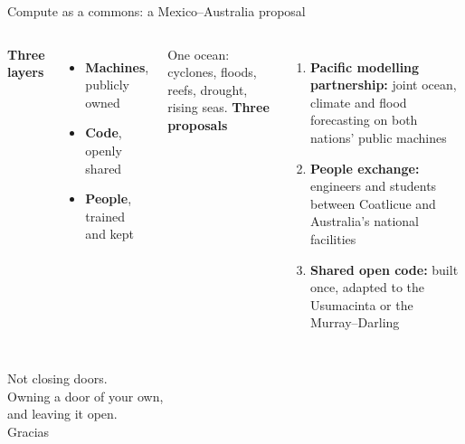 \documentclass[aspectratio=169,11pt]{beamer}
\begin{document}
\begin{frame}{Compute as a commons: a Mexico--Australia proposal}
\begin{columns}[T]
{\bfseries\color{ocean}Three layers}
\begin{itemize}\small
\item \textbf{Machines}, publicly owned
\item \textbf{Code}, openly shared
\item \textbf{People}, trained and kept
\end{itemize}
\vspace{0.3em}
{\small\color{mute}One ocean: cyclones, floods, reefs, drought, rising seas.}
{\bfseries\color{ocean}Three proposals}
\begin{enumerate}\small
\item \textbf{Pacific modelling partnership:} joint ocean, climate and flood forecasting on both nations' public machines
\item \textbf{People exchange:} engineers and students between Coatlicue and Australia's national facilities
\item \textbf{Shared open code:} built once, adapted to the Usumacinta or the Murray--Darling
\end{enumerate}
\end{columns}
\vspace{0.3em}
\begin{center}
\end{center}
\end{frame}

\begin{frame}[standout]
Not closing doors.\\[6pt]
Owning a door of your own,\\ and leaving it open.\\[18pt]
{\normalsize Gracias}
\end{frame}
\end{document}
